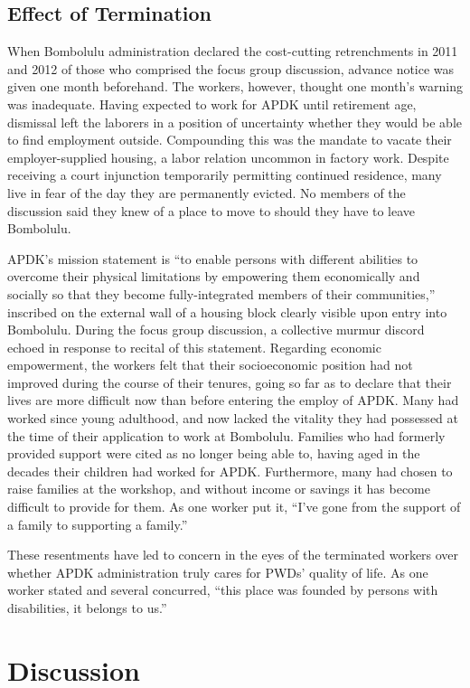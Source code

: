 \documentclass[american]{../../../coursework}
\begin{document}
\subsection{Effect of Termination}

When Bombolulu administration declared the cost-cutting retrenchments in 2011
and 2012 of those who comprised the focus group discussion, advance notice was
given one month beforehand. The workers, however, thought one month's warning
was inadequate. Having expected to work for APDK until retirement age,
dismissal left the laborers in a position of uncertainty whether they would be
able to find employment outside. Compounding this was the mandate to vacate
their employer-supplied housing, a labor relation uncommon in factory work.
Despite receiving a court injunction temporarily permitting continued
residence, many live in fear of the day they are permanently evicted. No
members of the discussion said they knew of a place to move to should they
have to leave Bombolulu.

APDK's mission statement is ``to enable persons with different abilities to
overcome their physical limitations by empowering them economically and
socially so that they become fully-integrated members of their communities,''
inscribed on the external wall of a housing block clearly visible upon entry
into Bombolulu. During the focus group discussion, a collective murmur discord
echoed in response to recital of this statement. Regarding economic
empowerment, the workers felt that their socioeconomic position had not
improved during the course of their tenures, going so far as to declare that
their lives are more difficult now than before entering the employ of APDK.
Many had worked since young adulthood, and now lacked the vitality they had
possessed at the time of their application to work at Bombolulu. Families who
had formerly provided support were cited as no longer being able to, having
aged in the decades their children had worked for APDK. Furthermore, many had
chosen to raise families at the workshop, and without income or savings it has
become difficult to provide for them. As one worker put it, ``I've gone from
the support of a family to supporting a family.''

These resentments have led to concern in the eyes of the terminated workers
over whether APDK administration truly cares for PWDs' quality of life. As one
worker stated and several concurred, ``this place was founded by persons with
disabilities, it belongs to us.''

\section{Discussion}
\end{document}
